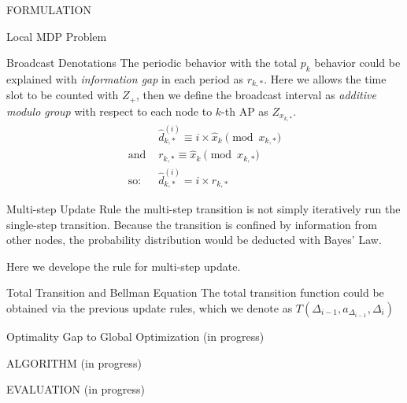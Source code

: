 \documentclass[10pt, conference, letterpaper]{IEEEtran}
\begin{document}
\begin{section}{FORMULATION}
\begin{subsection}{Local MDP Problem}
\begin{subsubsection}{Broadcast Denotations}
                The periodic behavior with the total $p_k$ behavior could be explained with \textit{information gap} in each period as $r_{k,*}$. Here we allows the time slot to be counted with $Z_+$, then we define the broadcast interval as \textit{additive modulo group} with respect to each node to $k$-th AP as $Z_{x_{k,*}}$.
                \begin{align}
                    & \hat{d}_{k,*}^{(i)} \equiv i \times \hat{x}_k \pmod{x_{k,*}}
                    \\
                    \text{and } & r_{k,*} \equiv \hat{x}_k \pmod{x_{k,*}}
                    \\
                    \text{so: } & \hat{d}_{k,*}^{(i)} = i \times r_{k,*}
                \end{align}
            \end{subsubsection}

            \begin{subsubsection}{Multi-step Update Rule}
                the multi-step transition is not simply iteratively run the single-step transition. Because the transition is confined by information from other nodes, the probability distribution would be deducted with Bayes' Law.

                Here we develope the rule for multi-step update.
            \end{subsubsection}

            \begin{subsubsection}{Total Transition and Bellman Equation}
                The total transition function could be obtained via the previous update rules, which we denote as $T(\Delta_{i-1}, a_{\Delta_{i-1}}, \Delta_{i})$
            \end{subsubsection}

            \begin{subsubsection}{Optimality Gap to Global Optimization}
                (in progress)
            \end{subsubsection}
        \end{subsection}

    \end{section}

    \begin{section}{ALGORITHM}
        \label{sec:algorithm}
        (in progress)
    \end{section}

    \begin{section}{EVALUATION}
        \label{sec:ealuation}
        (in progress)
    \end{section}
\end{document}
